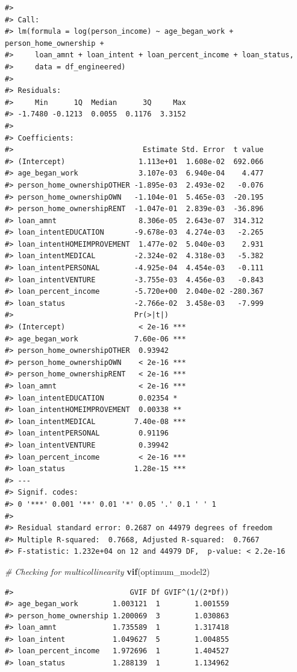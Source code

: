 \documentclass[
  10pt,
]{article}
\newenvironment{Shaded}{\begin{snugshade}}{\end{snugshade}}
\newcommand{\CommentTok}[1]{\textcolor[rgb]{0.56,0.35,0.01}{\textit{#1}}}
\newcommand{\FunctionTok}[1]{\textcolor[rgb]{0.13,0.29,0.53}{\textbf{#1}}}
\newcommand{\NormalTok}[1]{#1}
\begin{document}
\begin{verbatim}
#> 
#> Call:
#> lm(formula = log(person_income) ~ age_began_work + person_home_ownership + 
#>     loan_amnt + loan_intent + loan_percent_income + loan_status, 
#>     data = df_engineered)
#> 
#> Residuals:
#>     Min      1Q  Median      3Q     Max 
#> -1.7480 -0.1213  0.0055  0.1176  3.3152 
#> 
#> Coefficients:
#>                              Estimate Std. Error  t value
#> (Intercept)                 1.113e+01  1.608e-02  692.066
#> age_began_work              3.107e-03  6.940e-04    4.477
#> person_home_ownershipOTHER -1.895e-03  2.493e-02   -0.076
#> person_home_ownershipOWN   -1.104e-01  5.465e-03  -20.195
#> person_home_ownershipRENT  -1.047e-01  2.839e-03  -36.896
#> loan_amnt                   8.306e-05  2.643e-07  314.312
#> loan_intentEDUCATION       -9.678e-03  4.274e-03   -2.265
#> loan_intentHOMEIMPROVEMENT  1.477e-02  5.040e-03    2.931
#> loan_intentMEDICAL         -2.324e-02  4.318e-03   -5.382
#> loan_intentPERSONAL        -4.925e-04  4.454e-03   -0.111
#> loan_intentVENTURE         -3.755e-03  4.456e-03   -0.843
#> loan_percent_income        -5.720e+00  2.040e-02 -280.367
#> loan_status                -2.766e-02  3.458e-03   -7.999
#>                            Pr(>|t|)    
#> (Intercept)                 < 2e-16 ***
#> age_began_work             7.60e-06 ***
#> person_home_ownershipOTHER  0.93942    
#> person_home_ownershipOWN    < 2e-16 ***
#> person_home_ownershipRENT   < 2e-16 ***
#> loan_amnt                   < 2e-16 ***
#> loan_intentEDUCATION        0.02354 *  
#> loan_intentHOMEIMPROVEMENT  0.00338 ** 
#> loan_intentMEDICAL         7.40e-08 ***
#> loan_intentPERSONAL         0.91196    
#> loan_intentVENTURE          0.39942    
#> loan_percent_income         < 2e-16 ***
#> loan_status                1.28e-15 ***
#> ---
#> Signif. codes:  
#> 0 '***' 0.001 '**' 0.01 '*' 0.05 '.' 0.1 ' ' 1
#> 
#> Residual standard error: 0.2687 on 44979 degrees of freedom
#> Multiple R-squared:  0.7668, Adjusted R-squared:  0.7667 
#> F-statistic: 1.232e+04 on 12 and 44979 DF,  p-value: < 2.2e-16
\end{verbatim}

\begin{Shaded}
\begin{Highlighting}[]
\CommentTok{\# Checking for multicollinearity}
\FunctionTok{vif}\NormalTok{(optimum\_model2)}
\end{Highlighting}
\end{Shaded}

\begin{verbatim}
#>                           GVIF Df GVIF^(1/(2*Df))
#> age_began_work        1.003121  1        1.001559
#> person_home_ownership 1.200069  3        1.030863
#> loan_amnt             1.735589  1        1.317418
#> loan_intent           1.049627  5        1.004855
#> loan_percent_income   1.972696  1        1.404527
#> loan_status           1.288139  1        1.134962
\end{verbatim}
\end{document}
